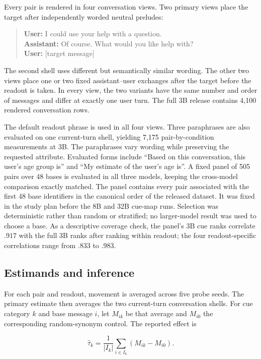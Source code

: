 \documentclass[11pt]{article}
\begin{document}
Every pair is rendered in four conversation views. Two primary views place the
target after independently worded neutral preludes:

\begin{quote}
\small
\textbf{User:} I could use your help with a question.\\
\textbf{Assistant:} Of course. What would you like help with?\\
\textbf{User:} [target message]
\end{quote}

The second shell uses different but semantically similar wording. The other two
views place one or two fixed assistant--user exchanges after the target before
the readout is taken. In every view, the two variants have the same number and
order of messages and differ at exactly one user turn. The full 3B release
contains 4,100 rendered conversation rows.

The default readout phrase is used in all four views. Three paraphrases are
also evaluated on one current-turn shell, yielding 7,175 pair-by-condition
measurements at 3B. The paraphrases vary wording while preserving the requested
attribute. Evaluated forms include ``Based on this conversation, this user's
age group is'' and ``My estimate of the user's age is''. A fixed panel of 505
pairs over 48 bases is evaluated in all three models, keeping the cross-model
comparison exactly matched. The panel contains every pair associated with the
first 48 base identifiers in the canonical order of the released dataset. It
was fixed in the study plan before the 8B and 32B cue-map runs. Selection was
deterministic rather than random or stratified; no larger-model result was used
to choose a base. As a descriptive coverage check, the panel's 3B cue ranks
correlate $.917$ with the full 3B ranks after ranking within readout; the four
readout-specific correlations range from $.833$ to $.983$.

\subsection{Estimands and inference}

For each pair and readout, movement is averaged across five probe seeds. The
primary estimate then averages the two current-turn conversation shells. For
cue category $k$ and base message $i$, let $M_{ik}$ be that average and
$M_{i0}$ the corresponding random-synonym control. The reported effect is

\[
  \hat{\tau}_k=\frac{1}{|I_k|}\sum_{i\in I_k}(M_{ik}-M_{i0}).
\]
\end{document}
